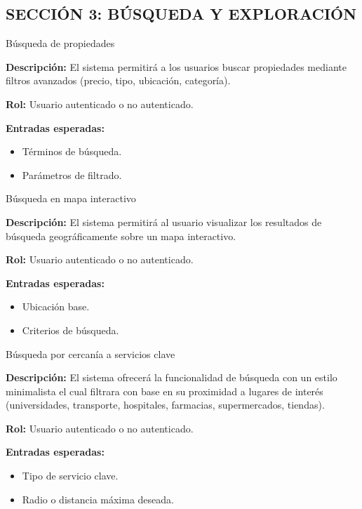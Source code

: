 \subsection*{\uppercase{Sección 3: Búsqueda y Exploración}}
\begin{requisito}{Búsqueda de propiedades}
	\item \textbf{Descripción:} El sistema permitirá a los usuarios buscar propiedades mediante filtros avanzados (precio, tipo, ubicación, categoría).
	\item \textbf{Rol:} Usuario autenticado o no autenticado.
	\item \textbf{Entradas esperadas:}
	\begin{itemize}
		\item Términos de búsqueda.
		\item Parámetros de filtrado.
	\end{itemize}
\end{requisito}
\begin{requisito}{Búsqueda en mapa interactivo}
	\item \textbf{Descripción:} El sistema permitirá al usuario visualizar los resultados de búsqueda geográficamente sobre un mapa interactivo.
	\item \textbf{Rol:} Usuario autenticado o no autenticado.
	\item \textbf{Entradas esperadas:}
	\begin{itemize}
		\item Ubicación base.
		\item Criterios de búsqueda.
	\end{itemize}
\end{requisito}
\begin{requisito}{Búsqueda por cercanía a servicios clave}
	\item \textbf{Descripción:} El sistema ofrecerá la funcionalidad de búsqueda con un estilo minimalista el cual filtrara con base en su proximidad a lugares de interés (universidades, transporte, hospitales, farmacias, supermercados, tiendas).
	\item \textbf{Rol:} Usuario autenticado o no autenticado.
	\item \textbf{Entradas esperadas:}
	\begin{itemize}
		\item Tipo de servicio clave.
		\item Radio o distancia máxima deseada.
	\end{itemize}
\end{requisito}
